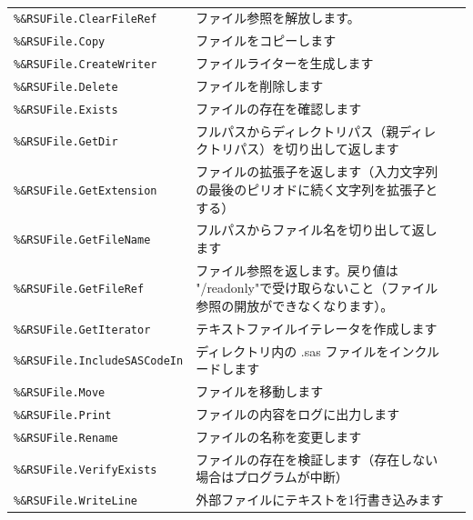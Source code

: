 \paragraph{\DocStrTitleRDMPackageFunctionList}
\begin{center}
{\footnotesize
\begin{xltabular}{\textwidth}{|p{4truecm}|X|p{1.2truecm}|}
\hline
\thead{\DocStrHeaderFunctionName}&\thead{\DocStrDescription}&\thead{\DocStrRefto}\\
\hline
\hline
\texttt{\%\&RSUFile.ClearFileRef}&ファイル参照を解放します。&\\
\hline
\texttt{\%\&RSUFile.Copy}&ファイルをコピーします&\\
\hline
\texttt{\%\&RSUFile.CreateWriter}&ファイルライターを生成します&\\
\hline
\texttt{\%\&RSUFile.Delete}&ファイルを削除します&\\
\hline
\texttt{\%\&RSUFile.Exists}&ファイルの存在を確認します&\\
\hline
\texttt{\%\&RSUFile.GetDir}&フルパスからディレクトリパス（親ディレクトリパス）を切り出して返します&\\
\hline
\texttt{\%\&RSUFile.GetExtension}&ファイルの拡張子を返します（入力文字列の最後のピリオドに続く文字列を拡張子とする）&\\
\hline
\texttt{\%\&RSUFile.GetFileName}&フルパスからファイル名を切り出して返します&\\
\hline
\texttt{\%\&RSUFile.GetFileRef}&ファイル参照を返します。戻り値は "/readonly"で受け取らないこと（ファイル参照の開放ができなくなります）。&\\
\hline
\texttt{\%\&RSUFile.GetIterator}&テキストファイルイテレータを作成します&\\
\hline
\texttt{\%\&RSUFile.IncludeSASCodeIn}&ディレクトリ内の .sas ファイルをインクルードします&\\
\hline
\texttt{\%\&RSUFile.Move}&ファイルを移動します&\\
\hline
\texttt{\%\&RSUFile.Print}&ファイルの内容をログに出力します&\\
\hline
\texttt{\%\&RSUFile.Rename}&ファイルの名称を変更します&\\
\hline
\texttt{\%\&RSUFile.VerifyExists}&ファイルの存在を検証します（存在しない場合はプログラムが中断）&\\
\hline
\texttt{\%\&RSUFile.WriteLine}&外部ファイルにテキストを1行書き込みます&\\
\hline
\end{xltabular}
}
\end{center}
